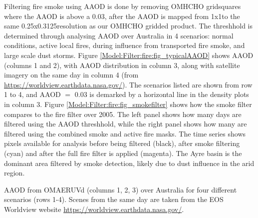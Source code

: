     Filtering fire smoke using AAOD is done by removing OMHCHO gridsquares where the AAOD is above a 0.03, after the AAOD is mapped from 1x1\degr to the same 0.25x0.3125\degr resolution as our OMHCHO gridded product.
    The threshhold is determined through analysing AAOD over Australia in 4 scenarios: normal conditions, active local fires, during influence from transported fire smoke, and large scale dust storms.
    Figure \ref{Model:Filter:fire:fig_typicalAAOD} shows AAOD (columns 1 and 2), with AAOD distribution in column 3, along with satellite imagery on the same day in column 4 (from \url{https://worldview.earthdata.nasa.gov/}).
    The scenarios listed are shown from row 1 to 4, and AAOD $=$ 0.03 is demarked by a horizontal line in the density plots in column 3.
    Figure \ref{Model:Filter:fire:fig_smokefilter} shows how the smoke filter compares to the fire filter over 2005.
    The left panel shows how many days are filtered using the AAOD threshhold, while the right panel shows how many are filtered using the combined smoke and active fire masks.
    The time series shows pixels available for analysis before being filtered (black), after smoke filtering (cyan) and after the full fire filter is applied (magenta).
    The Ayre basin is the dominant area filtered by smoke detection, likely due to dust influence in the arid region.
    
      {AAOD from OMAERUVd (columns 1, 2, 3) over Australia for four different scenarios (rows 1-4). Scenes from the same day are taken from the EOS Worldview website \url{https://worldview.earthdata.nasa.gov/}.}
      {\label{Model:Filter:fire:fig_typicalAAOD}}
    
    
